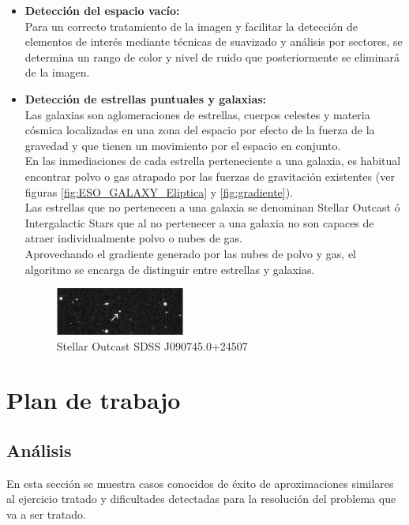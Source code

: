 \begin{itemize}
		\item \textbf{Detección del espacio vacío:}\\
		Para un correcto tratamiento de la imagen y facilitar la detección de elementos de interés mediante técnicas de suavizado y análisis por sectores, se determina un rango de color y nivel de ruido que posteriormente se eliminará de la imagen.
		
		\item \textbf{Detección de estrellas puntuales y galaxias:}\\
		Las galaxias son aglomeraciones de estrellas, cuerpos celestes y materia cósmica localizadas en una zona del espacio por efecto de la fuerza de la gravedad y que tienen un movimiento por el espacio en conjunto.\\
		En las inmediaciones de cada estrella perteneciente a una galaxia, es habitual encontrar polvo o gas atrapado por las fuerzas de gravitación existentes (ver figuras \ref{fig:ESO_GALAXY_Eliptica} y \ref{fig:gradiente}).\\

		Las estrellas que no pertenecen a una galaxia se denominan Stellar Outcast\cite{stellarOutcast} ó Intergalactic Stars que al no pertenecer a una galaxia no son capaces de atraer individualmente polvo o nubes de gas.\\
		Aprovechando el gradiente generado por las nubes de polvo y gas, el	algoritmo se encarga de distinguir entre estrellas y galaxias.
		\begin{figure}[!htb]%
			\centering
			\includegraphics[width=0.4\textwidth]{images/star.jpg}
			\caption{\label{fig:IntergalacticStar}{\small Stellar Outcast SDSS J090745.0+24507}}
		\end{figure}

	\end{itemize}	

	\vfill

	\section{Plan de trabajo}
	\subsection{Análisis }
		En esta sección se muestra casos conocidos de éxito de aproximaciones similares al ejercicio tratado y dificultades detectadas para la resolución del problema que va a ser tratado.
